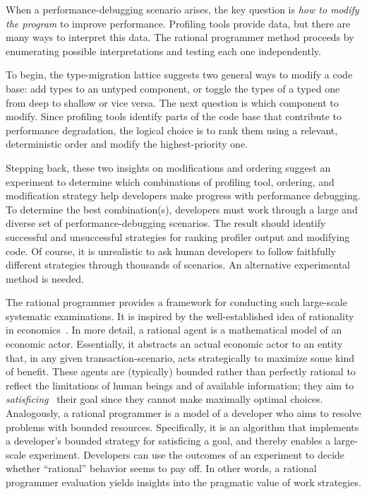 
When a performance-debugging scenario arises, the key question is \emph{how
to modify the program} to improve performance.
Profiling tools provide data, but there are many ways to interpret this data.
The rational programmer method proceeds by enumerating possible
interpretations and testing each one independently.

To begin, the type-migration lattice suggests two general ways to modify a
code base:
add types to an untyped component, or toggle the types of a typed one
from deep to shallow or vice versa.
The next question is which component to modify.
Since profiling tools identify parts of the code base that contribute to performance
degradation, the logical choice is to rank them using a relevant, deterministic
order and modify the highest-priority one.

Stepping back, these two insights on modifications and ordering suggest
an experiment to determine which combinations of profiling tool,
ordering, and modification strategy help developers make progress with
performance debugging.
To determine the best combination(s), developers must work through a
large and diverse set of performance-debugging scenarios.
The result should identify successful and unsuccessful strategies for ranking
profiler output and modifying code.
Of course, it is unrealistic to ask human developers to follow faithfully different
strategies through thousands
of scenarios. An alternative experimental method is needed.

The rational programmer provides a framework for conducting such
large-scale systematic examinations.
It is inspired by the well-established idea of rationality in
economics~\cite{mill1874essays, henrich2001search}.  In more detail, a
rational agent is a mathematical model of an economic actor. Essentially, it
abstracts an actual economic actor to an entity that, in any given
transaction-scenario, acts strategically to maximize some kind of benefit.
These agents are (typically) bounded rather than perfectly rational
to reflect the limitations of human beings and of available information;
they aim to \emph{satisficing}~\cite{hs:satisfice} their goal since
they cannot make maximally optimal choices.
Analogously, a rational programmer is a model of a developer who aims to
resolve problems with bounded resources.
Specifically, it is an algorithm that implements a developer's bounded
strategy for {satisficing} a goal, and thereby enables a large-scale
experiment.
Developers can use the outcomes of an experiment to decide whether
``rational'' behavior seems to pay off.
In other words, a rational programmer evaluation yields insights into the
pragmatic value of work strategies.


